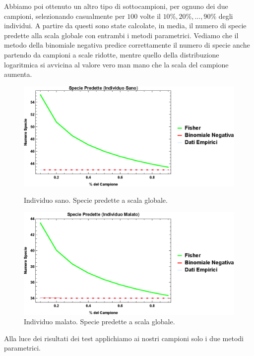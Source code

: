 Abbiamo poi ottenuto un altro tipo di sottocampioni, per ognuno dei due campioni, selezionando casualmente per $100$ volte il $10 \%, 20 \%,...,90 \%$ degli individui. A partire da questi sono state calcolate, in media, il numero di specie predette alla scala globale con entrambi i metodi parametrici. Vediamo che il metodo della binomiale negativa predice correttamente il numero di specie anche partendo da campioni a scale ridotte, mentre quello della distribuzione logaritmica si avvicina al valore vero man mano che la scala del campione aumenta.

\begin{figure}[H]
  \centering
  \begin{minipage}[b]{0.4\textwidth}
    \includegraphics[width=\textwidth]{Figure/cfrpredSpH.eps}
    \caption{Individuo sano. Specie predette a scala globale.}
    \label{fig:predSpH}
  \end{minipage}
  \hfill
  \begin{minipage}[b]{0.4\textwidth}
    \includegraphics[width=\textwidth]{Figure/cfrpredSpC.eps}
\caption{Individuo malato. Specie predette a scala globale.}
\label{fig:predSpC}
  \end{minipage}
\end{figure}

Alla luce dei risultati dei test applichiamo ai nostri campioni solo i due metodi parametrici.\newline

